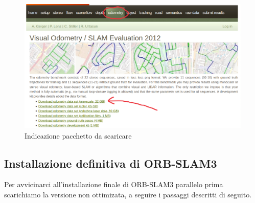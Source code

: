 \documentclass[12pt,a4paper]{report}
\begin{document}
\begin{figure}[h]
    \centering
    \includegraphics[width=0.9\linewidth]{img/kitti_dataset.png}
    \caption{Indicazione pacchetto da scaricare}
\end{figure}

\subsection{Installazione definitiva di ORB-SLAM3}

Per avvicinarci all'installazione finale di ORB-SLAM3 parallelo prima scarichiamo la versione non ottimizata, a seguire i passaggi descritti di seguito.
\end{document}
